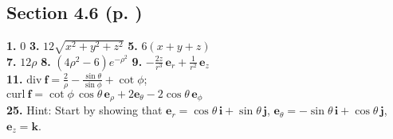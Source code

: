 \begin{multicols}{2}
\subsection*{Section 4.6 (p. \pageref{sec4dot6})}
\textbf{1.} $0$\quad
\textbf{3.} $12\sqrt{x^2 + y^2 + z^2}$\quad
\textbf{5.} $6(x+y+z)$\\
\textbf{7.} $12\rho$ \quad
\textbf{8.} $(4\rho^2 -6)e^{-\rho^2}$ \quad
\textbf{9.} $-\frac{2z}{r^3}\,\textbf{e}_{r} + \frac{1}{r^2}\,\textbf{e}_{z}$\\
\textbf{11.} $\text{div}~\textbf{f} = \frac{2}{\rho} - \frac{\sin\theta}{\sin\phi} + \cot\phi$;\\$\text{curl}~\textbf{f}
= \cot\phi\,\cos\theta\,\textbf{e}_{\rho} + 2\textbf{e}_{\theta} -2\cos\theta\,\textbf{e}_{\phi}$\\
\textbf{25.} Hint: Start by showing that $\textbf{e}_{r} = \cos\theta\,\textbf{i} + \sin\theta\,\textbf{j}$,
$\textbf{e}_{\theta} = -\sin\theta\,\textbf{i} + \cos\theta\,\textbf{j}$, $\textbf{e}_{z} = \textbf{k}$.
\end{multicols}
